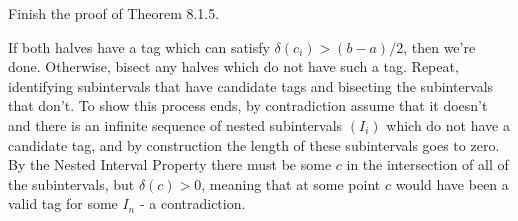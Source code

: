 \begin{exercise}
Finish the proof of Theorem 8.1.5.
\end{exercise}
\begin{solution}
If both halves have a tag which can satisfy \(\delta(c_i) > (b-a)/2\), then we're done. Otherwise, bisect any halves which do not have such a tag. Repeat, identifying subintervals that have candidate tags and bisecting the subintervals that don't. To show this process ends, by contradiction assume that it doesn't and there is an infinite sequence of nested subintervals \((I_i)\) which do not have a candidate tag, and by construction the length of these subintervals goes to zero. By the Nested Interval Property there must be some \(c\) in the intersection of all of the subintervals, but \(\delta(c) > 0\), meaning that at some point \(c\) would have been a valid tag for some \(I_n\) - a contradiction.
\end{solution}
